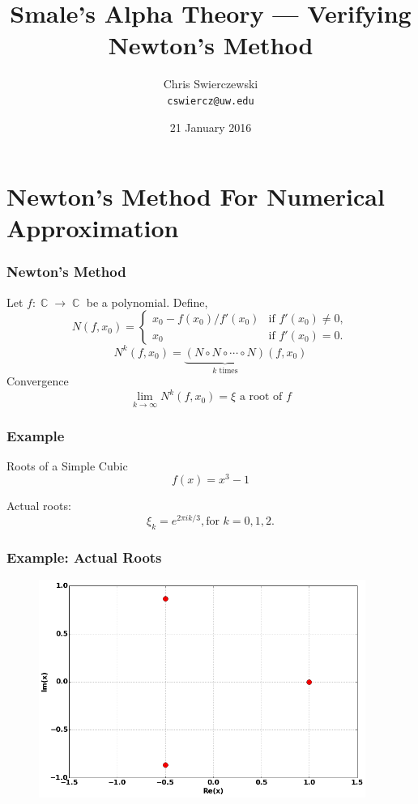 \documentclass{beamer}
\title{Smale's Alpha Theory --- Verifying Newton's Method}
\author{
  Chris Swierczewski\\
  {\tt cswiercz@uw.edu}
}
\date{21 January 2016}
\institute{
  Department of Applied Mathematics\\
  University of Washington\\
  Seattle, Washington
}
\DeclareMathOperator{\CC}{\mathbb{C}}
\begin{document}

\begin{frame}
  \titlepage
\end{frame}


\section{Newton's Method For Numerical Approximation}


\begin{frame}
  \frametitle{Newton's Method}
  Let $f: \CC \to \CC$ be a polynomial. Define,
  \[
  N(f,x_0)
  =
  \begin{cases}
    x_0 - f(x_0) / f'(x_0) & \text{if } f'(x_0) \neq 0, \\
    x_0 & \text{if } f'(x_0) = 0.
  \end{cases}
  \]
  \pause
  \[
  N^k(f,x_0) =
  \underbrace{(N \circ N \circ \cdots \circ N)}_{k \text{ times}} (f,x_0)
  \]
  \pause
  Convergence
  \[
  \lim_{k \to \infty} N^k(f,x_0) = \xi \text{ a root of $f$}
  \]
\end{frame}

\begin{frame}
  \frametitle{Example}

  \begin{block}{Roots of a Simple Cubic}
    \[
    f(x) = x^3 - 1
    \]
  \end{block}
  Actual roots:
  \[
  \xi_k = e^{2 \pi i k / 3}, \text{for } k = 0,1,2.
  \]
\end{frame}



\begin{frame}
  \frametitle{Example: Actual Roots}
  \begin{figure}
    \centering
    \includegraphics[width=0.95\textwidth]{images/newton_roots.png}
  \end{figure}
\end{frame}
\end{document}
